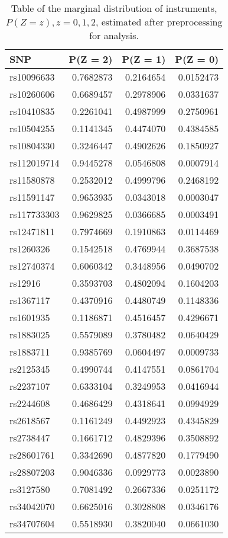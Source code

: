 \documentclass[
]{article}
\theoremstyle{plain}
\begin{document}
\begin{table}[H]
  \caption{Table of the marginal distribution of instruments, $P(Z = z), z = 0,1,2$, estimated after preprocessing for analysis.}
  \label{tab:marginal-distribution-of-instruments-lung-cancer}
  \begin{minipage}{0.5\linewidth}
    \center
    
\begin{tabular}{lrrr}
\toprule
SNP & P(Z = 2) & P(Z = 1) & P(Z = 0)\\
\midrule
rs10096633 & 0.7682873 & 0.2164654 & 0.0152473\\
rs10260606 & 0.6689457 & 0.2978906 & 0.0331637\\
rs10410835 & 0.2261041 & 0.4987999 & 0.2750961\\
rs10504255 & 0.1141345 & 0.4474070 & 0.4384585\\
rs10804330 & 0.3246447 & 0.4902626 & 0.1850927\\
\addlinespace
rs112019714 & 0.9445278 & 0.0546808 & 0.0007914\\
rs11580878 & 0.2532012 & 0.4999796 & 0.2468192\\
rs11591147 & 0.9653935 & 0.0343018 & 0.0003047\\
rs117733303 & 0.9629825 & 0.0366685 & 0.0003491\\
rs12471811 & 0.7974669 & 0.1910863 & 0.0114469\\
\addlinespace
rs1260326 & 0.1542518 & 0.4769944 & 0.3687538\\
rs12740374 & 0.6060342 & 0.3448956 & 0.0490702\\
rs12916 & 0.3593703 & 0.4802094 & 0.1604203\\
rs1367117 & 0.4370916 & 0.4480749 & 0.1148336\\
rs1601935 & 0.1186871 & 0.4516457 & 0.4296671\\
\addlinespace
rs1883025 & 0.5579089 & 0.3780482 & 0.0640429\\
rs1883711 & 0.9385769 & 0.0604497 & 0.0009733\\
rs2125345 & 0.4990744 & 0.4147551 & 0.0861704\\
rs2237107 & 0.6333104 & 0.3249953 & 0.0416944\\
rs2244608 & 0.4686429 & 0.4318641 & 0.0994929\\
\addlinespace
rs2618567 & 0.1161249 & 0.4492923 & 0.4345829\\
rs2738447 & 0.1661712 & 0.4829396 & 0.3508892\\
rs28601761 & 0.3342690 & 0.4877820 & 0.1779490\\
rs28807203 & 0.9046336 & 0.0929773 & 0.0023890\\
rs3127580 & 0.7081492 & 0.2667336 & 0.0251172\\
\addlinespace
rs34042070 & 0.6625016 & 0.3028808 & 0.0346176\\
rs34707604 & 0.5518930 & 0.3820040 & 0.0661030\\
\bottomrule
\end{tabular}



\end{minipage}
\end{table}
\end{document}
